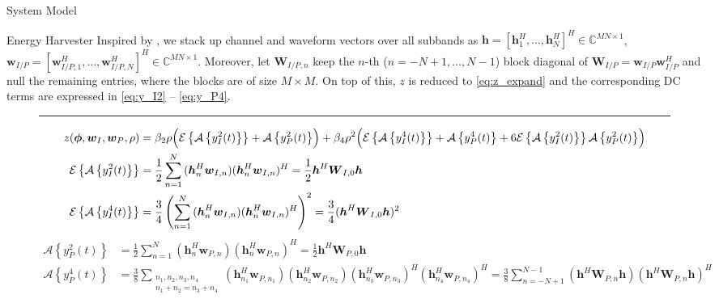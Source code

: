 \documentclass[journal]{IEEEtran}
\begin{document}
\begin{section}{System Model}
\begin{subsection}{Energy Harvester}
			Inspired by \cite{Huang2017}, we stack up channel and waveform vectors over all subbands as $\boldsymbol{h}=[\boldsymbol{h}_1^H,\dots,\boldsymbol{h}_N^H]^H \in \mathbb{C}^{MN \times 1}$, $\boldsymbol{w}_{I/P}=[\boldsymbol{w}_{I/P,1}^H,\dots,\boldsymbol{w}_{I/P,N}^H]^H \in \mathbb{C}^{MN \times 1}$. Moreover, let $\boldsymbol{W}_{I/P,n}$ keep the $n$-th ($n=-N+1,\dots,N-1$) block diagonal of $\boldsymbol{W}_{I/P}=\boldsymbol{w}_{I/P}\boldsymbol{w}_{I/P}^H$ and null the remaining entries, where the blocks are of size $M \times M$. On top of this, $z$ is reduced to \ref{eq:z_expand} and the corresponding DC terms are expressed in \ref{eq:y_I2} -- \ref{eq:y_P4}.
			\begin{figure*}[b]
				\hrule
				\begin{align}
					z(\boldsymbol{\phi},\boldsymbol{w}_I,\boldsymbol{w}_P,\rho)
					& = \beta_2\rho\Bigl(\mathcal{E}\left\{\mathcal{A}\left\{y_{I}^2(t)\right\}\right\}+\mathcal{A}\left\{y_{P}^2(t)\right\}\Bigr)+\beta_4\rho^2\Bigl(\mathcal{E}\left\{\mathcal{A}\left\{y_{I}^4(t)\right\}\right\}+\mathcal{A}\left\{y_{P}^4(t)\right\}+6\mathcal{E}\left\{\mathcal{A}\left\{y_{I}^2(t)\right\}\right\}\mathcal{A}\left\{y_{P}^2(t)\right\}\Bigr)\label{eq:z_expand}\\
					\mathcal{E}\left\{\mathcal{A}\left\{y_{I}^2(t)\right\}\right\}
					& = \frac{1}{2}\sum_{n=1}^N{(\boldsymbol{h}_{n}^H\boldsymbol{w}_{I,n})(\boldsymbol{h}_{n}^H\boldsymbol{w}_{I,n})^H} = \frac{1}{2}\boldsymbol{h}^H\boldsymbol{W}_{I,0}\boldsymbol{h}\label{eq:y_I2}\\
					\mathcal{E}\left\{\mathcal{A}\left\{y_{I}^4(t)\right\}\right\}
					& = \frac{3}{4}\left(\sum_{n=1}^N{(\boldsymbol{h}_{n}^H\boldsymbol{w}_{I,n})(\boldsymbol{h}_{n}^H\boldsymbol{w}_{I,n})^H}\right)^2 = \frac{3}{4}(\boldsymbol{h}^H\boldsymbol{W}_{I,0}\boldsymbol{h})^2\label{eq:y_I4}
				\end{align}
				\begin{align}
					\mathcal{A}\left\{y_{P}^2(t)\right\}
					& = \frac{1}{2}\sum_{n=1}^N{(\boldsymbol{h}_{n}^H\boldsymbol{w}_{P,n})(\boldsymbol{h}_{n}^H\boldsymbol{w}_{P,n})^H} = \frac{1}{2}\boldsymbol{h}^H\boldsymbol{W}_{P,0}\boldsymbol{h}\label{eq:y_P2}\\
					\mathcal{A}\left\{y_{P}^4(t)\right\}
					& = \frac{3}{8}\sum_{\substack{{n_1},{n_2},{n_3},{n_4}\\{n_1}+{n_2}={n_3}+{n_4}}}{(\boldsymbol{h}_{{n_1}}^H\boldsymbol{w}_{P,{n_1}})(\boldsymbol{h}_{{n_2}}^H\boldsymbol{w}_{P,{n_2}})(\boldsymbol{h}_{{n_3}}^H\boldsymbol{w}_{P,{n_3}})^H(\boldsymbol{h}_{{n_4}}^H\boldsymbol{w}_{P,{n_4}})^H} = \frac{3}{8}\sum_{n=-N+1}^{N-1}(\boldsymbol{h}^H\boldsymbol{W}_{P,n}\boldsymbol{h})(\boldsymbol{h}^H\boldsymbol{W}_{P,n}\boldsymbol{h})^H\label{eq:y_P4}
				\end{align}
			\end{figure*}
		\end{subsection}


\end{section}
\end{document}
